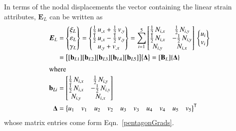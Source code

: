 In terms of the nodal displacements the vector containing the linear strain attributes, $\boldsymbol{E}_L$ can be written as
\begin{subequations}
\begin{align}
    \boldsymbol{E}_L & = \begin{Bmatrix}
    \xi_{L} \\
    \varepsilon_{L} \\
    \gamma_{L} \end{Bmatrix} = 
    \begin{Bmatrix}
    \tfrac{1}{2} \, u_{,x} + \tfrac{1}{2} \, v_{,y} \\
    \tfrac{1}{2} \, u_{,x} - \tfrac{1}{2} \, v_{,y} \\
    u_{,y} + v_{,x} \end{Bmatrix} = 
    \sum_{i=1}^5 \begin{bmatrix}
    \tfrac{1}{2} \, N_{i,x} & \tfrac{1}{2} \, N_{i,y}  \\
    \tfrac{1}{2} \, N_{i,x} & -\tfrac{1}{2} \, N_{i,y} \\ 
    N_{i,y} & N_{i,x}  \end{bmatrix} \, 
    \begin{Bmatrix}
    u_{i} \\
    v_{i} 
    \end{Bmatrix} \notag \\
    & = \bigl[ [\mathbf{b}_{L1}] [\mathbf{b}_{L2}] [\mathbf{b}_{L3}] 
    [\mathbf{b}_{L4}] [\mathbf{b}_{L5}] \bigr]
    \bigl\{ \boldsymbol{\Delta} \bigr\}  
    = [\mathbf{B}_L] \{ \boldsymbol{\Delta} \} \\
    \intertext{where}
    \mathbf{b}_{Li} & = \begin{bmatrix}
    \tfrac{1}{2} \, N_{i,x}  &  \tfrac{1}{2} \, N_{i,y} \\
    \tfrac{1}{2} \, N_{i,x}  & - \tfrac{1}{2} \, N_{i,y} \\
    N_{i,y} & N_{i,x} 
    \end{bmatrix} \\
    \boldsymbol{\Delta} & = \bigl\{ \begin{matrix}
    u_1 & v_1 & u_2 & v_2 & u_3 & v_3 & u_4 & v_4 & u_5 & v_5 
    \end{matrix} \bigr\}^{\mathsf{T}}
\end{align}
\end{subequations}
whose matrix entries come form Eqn.~\eqref{pentagonGrads}.

